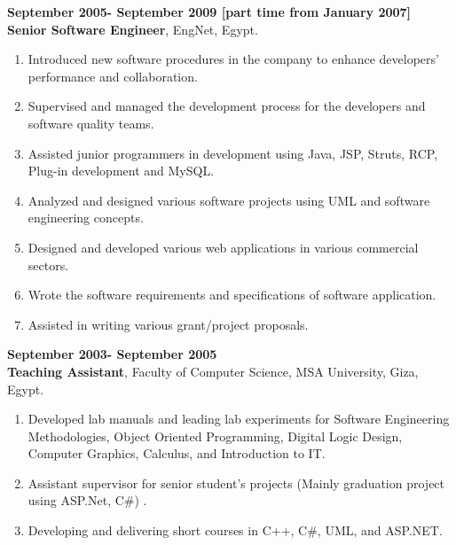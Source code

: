 \documentclass{article}
\begin{document}
 \textbf{September 2005- September 2009 [part time from January 2007] }\\
 \textbf{Senior Software Engineer}, EngNet, Egypt.

 \begin{enumerate}

\item Introduced new software procedures in the company to enhance developers' performance and collaboration.
 \item Supervised and managed the development process for the developers and software quality teams.
 \item Assisted junior programmers in development using Java, JSP, Struts, RCP, Plug-in development and MySQL.
  \item Analyzed and designed various software projects using UML and software engineering concepts.
 \item Designed and developed various web applications in various commercial sectors.
 \item Wrote the software requirements and specifications of software application.
 \item Assisted in writing various grant/project proposals.
\end{enumerate}

 \textbf{September 2003- September 2005}\\
 \textbf{Teaching Assistant}, Faculty of Computer Science, MSA University, Giza, Egypt.
 \begin{enumerate}
\item Developed lab manuals and leading lab experiments for Software Engineering
Methodologies, Object Oriented Programming, Digital Logic Design, Computer Graphics, Calculus, and Introduction to IT.
 \item Assistant supervisor for senior student's projects (Mainly graduation project using ASP.Net, C\#) .
 \item Developing and delivering short courses in C++, C\#, UML, and ASP.NET.
\end{enumerate}
\end{document}
